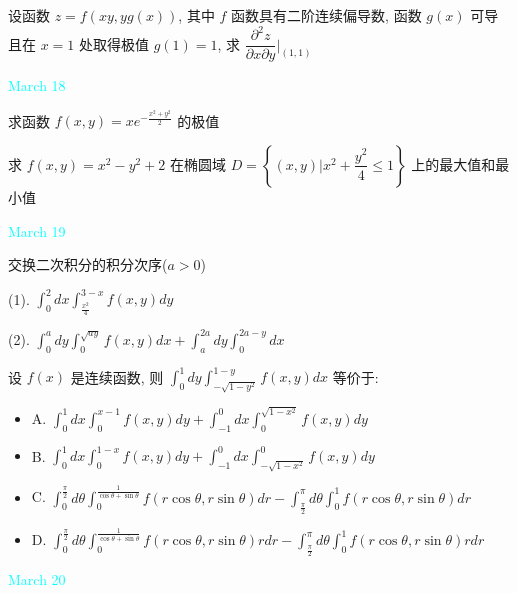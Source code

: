 \begin{example}[][Exam: 29.3.6]
	设函数 $z=f(xy,yg(x))$, 其中 $f$ 函数具有二阶连续偏导数, 函数 $g(x)$ 可导且在 $x=1$ 处取得极值 $g(1)=1$, 求 $\dfrac{\partial^{2}z}{\partial x\partial y}|_{(1,1)}$
\end{example}

\textcolor{cyan}{March 18}

\begin{example}[][Exam: 29.3.7]
	求函数 $f(x,y)=xe^{-\frac{x^{2}+y^{2}}{2}}$ 的极值
\end{example}

\begin{example}[][Exam: 29.3.8]
	求 $f(x,y)=x^{2}-y^{2}+2$ 在椭圆域 $D=\left\lbrace (x,y)|x^{2}+\dfrac{y^{2}}{4}\leq 1\right\rbrace$ 上的最大值和最小值
\end{example}

\textcolor{cyan}{March 19}

\begin{example}[][Exam: 29.3.9]
	交换二次积分的积分次序($a>0$)

(1). $\displaystyle{\int_{0}^{2}dx\int_{\frac{x^{2}}{4}}^{3-x}f(x,y)dy}$

(2). $\displaystyle{\int_{0}^{a}dy\int_{0}^{\sqrt{ay}}f(x,y)dx+\int_{a}^{2a}dy\int_{0}^{2a-y}dx}$
\end{example}

\begin{example}[][Exam: 29.3.10]
	设 $f(x)$ 是连续函数, 则 $\int_{0}^{1}dy\int_{-\sqrt{1-y^{2}}}^{1-y}f(x,y)dx$ 等价于:
\begin{itemize}
	\item A. $\int_{0}^{1}dx\int_{0}^{x-1}f(x,y)dy+\int_{-1}^{0}dx\int_{0}^{\sqrt{1-x^{2}}}f(x,y)dy$
	\item B. $\int_{0}^{1}dx\int_{0}^{1-x}f(x,y)dy+\int_{-1}^{0}dx\int_{-\sqrt{1-x^{2}}}^{0}f(x,y)dy$
	\item C. $\int_{0}^{\frac{\pi}{2}}d\theta\int_{0}^{\frac{1}{\cos\theta+\sin\theta}}f(r\cos\theta,r\sin\theta)dr-\int_{\frac{\pi}{2}}^{\pi}d\theta\int_{0}^{1}f(r\cos\theta,r\sin\theta)dr$
	\item D. $\int_{0}^{\frac{\pi}{2}}d\theta\int_{0}^{\frac{1}{\cos\theta+\sin\theta}}f(r\cos\theta,r\sin\theta)rdr-\int_{\frac{\pi}{2}}^{\pi}d\theta\int_{0}^{1}f(r\cos\theta,r\sin\theta)rdr$
\end{itemize}
\end{example}

\textcolor{cyan}{March 20}

